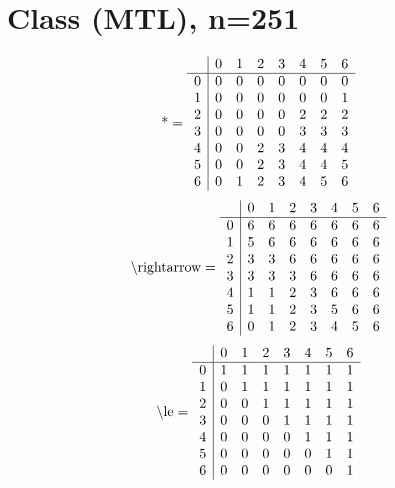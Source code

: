 \documentclass[11pt]{article}
\begin{document}
\section{Class (MTL), n=251}
\[\text{*} = 
\begin{array}{r | r r r r r r r}
 & 0 & 1 & 2 & 3 & 4 & 5 & 6 \\ \hline
0 & 0 & 0 & 0 & 0 & 0 & 0 & 0 \\
1 & 0 & 0 & 0 & 0 & 0 & 0 & 1 \\
2 & 0 & 0 & 0 & 0 & 2 & 2 & 2 \\
3 & 0 & 0 & 0 & 0 & 3 & 3 & 3 \\
4 & 0 & 0 & 2 & 3 & 4 & 4 & 4 \\
5 & 0 & 0 & 2 & 3 & 4 & 4 & 5 \\
6 & 0 & 1 & 2 & 3 & 4 & 5 & 6 \\
\end{array}
\]
\[\text{\textbackslash rightarrow} = 
\begin{array}{r | r r r r r r r}
 & 0 & 1 & 2 & 3 & 4 & 5 & 6 \\ \hline
0 & 6 & 6 & 6 & 6 & 6 & 6 & 6 \\
1 & 5 & 6 & 6 & 6 & 6 & 6 & 6 \\
2 & 3 & 3 & 6 & 6 & 6 & 6 & 6 \\
3 & 3 & 3 & 3 & 6 & 6 & 6 & 6 \\
4 & 1 & 1 & 2 & 3 & 6 & 6 & 6 \\
5 & 1 & 1 & 2 & 3 & 5 & 6 & 6 \\
6 & 0 & 1 & 2 & 3 & 4 & 5 & 6 \\
\end{array}
\]
\[\text{\textbackslash le} = 
\begin{array}{r | r r r r r r r}
 & 0 & 1 & 2 & 3 & 4 & 5 & 6 \\ \hline
0 & 1 & 1 & 1 & 1 & 1 & 1 & 1 \\
1 & 0 & 1 & 1 & 1 & 1 & 1 & 1 \\
2 & 0 & 0 & 1 & 1 & 1 & 1 & 1 \\
3 & 0 & 0 & 0 & 1 & 1 & 1 & 1 \\
4 & 0 & 0 & 0 & 0 & 1 & 1 & 1 \\
5 & 0 & 0 & 0 & 0 & 0 & 1 & 1 \\
6 & 0 & 0 & 0 & 0 & 0 & 0 & 1 \\
\end{array}
\]
\end{document}

